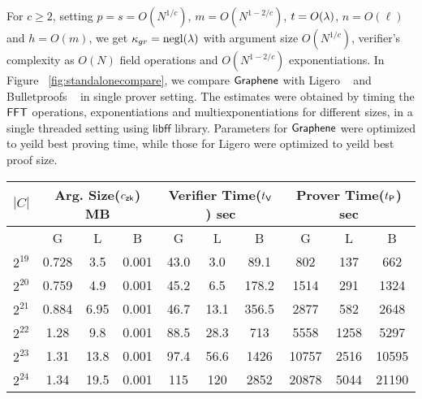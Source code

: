 For $c\geq 2$, setting $p=s=O(N^{1/c})$, $m=O(N^{1-2/c})$, $t=O(\lambda)$,
$n=O(\ell)$ and $h=O(m)$, we get $\kappa_{gr}=\mathrm{negl}(\lambda)$ with argument size
$O(N^{1/c})$, verifier's complexity as $O(N)$ field operations and
$O(N^{1-2/c})$ exponentiations. In Figure ~\ref{fig:standalonecompare}, we compare
$\textsf{Graphene}$ with Ligero ~\cite{ligero} and Bulletproofs ~\cite{bulletproofs} in
single prover setting. The estimates were obtained by timing the $\mathsf{FFT}$
operations, exponentiations and multiexponentiations for different sizes, in a
single threaded setting using $\mathsf{libff}$ library. Parameters for $\textsf{Graphene}$ were optimized to yeild best
proving time, while those for Ligero were optimized to yeild best proof size.
\begin{figure*}
\centering
\begin{tabular}{|c|c|c|c|c|c|c|c|c|c|}
\hline
$|C|$ & \multicolumn{3}{|c|}{Arg. Size($c_\mathsf{zk}$) MB} &
        \multicolumn{3}{|c|}{Verifier Time($t_{\mathsf{V}}$) sec} &
        \multicolumn{3}{|c|}{Prover Time($t_{\mathsf{P}}$) sec} \\
\hline
 & \textsf{G} & \textsf{L} & \textsf{B} &
   \textsf{G} & \textsf{L} & \textsf{B} &
   \textsf{G} & \textsf{L} & \textsf{B} \\
\hline
$2^{19}$ & 0.728 & 3.5 & 0.001 & 43.0 & 3.0 & 89.1 & 802 & 137 & 662 \\
$2^{20}$ & 0.759 & 4.9 & 0.001 & 45.2 & 6.5 & 178.2 & 1514 & 291 & 1324 \\
$2^{21}$ & 0.884 & 6.95 & 0.001 & 46.7 & 13.1 & 356.5 & 2877 & 582 & 2648 \\
$2^{22}$ & 1.28  & 9.8 & 0.001 & 88.5 & 28.3 & 713 & 5558 & 1258 & 5297 \\
$2^{23}$ & 1.31  & 13.8 & 0.001 & 97.4 & 56.6 & 1426 & 10757 & 2516 & 10595 \\
$2^{24}$ & 1.34  & 19.5 & 0.001 & 115 & 120 & 2852 & 20878 & 5044 & 21190 \\
\hline
\end{tabular}
\caption{Comparison of Graphene(G), Ligero(L) and Bulletproofs(B) in single
prover setting for 80 bits of security}
\label{fig:standalonecompare}
\end{figure*}

